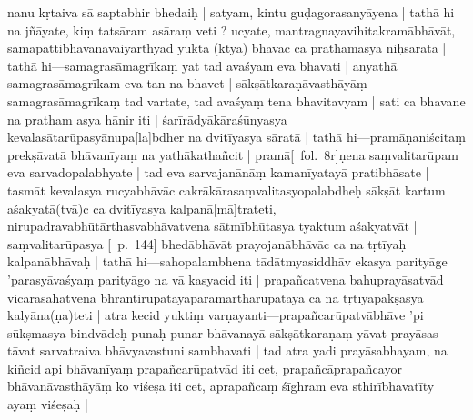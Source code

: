 \documentclass[12pt]{article}
\newcommand{\emdash} {\hspace{0em}—\hspace{0em}}
\begin{document}
nanu kṛtaiva sā saptabhir bhedaiḥ | satyam, kintu guḍagorasanyāyena | tathā hi na jñāyate, kiṃ tatsāram asāraṃ veti ? ucyate, mantragnayavihitakramābhāvāt, samāpattibhāvanāvaiyarthyād yuktā (ktya) bhāvāc ca prathamasya niḥsāratā | tathā hi\emdash samagrasāmagrīkaṃ yat tad avaśyam eva bhavati | anyathā samagrasāmagrīkam eva tan na bhavet | sākṣātkaraṇāvasthāyāṃ samagrasāmagrīkaṃ tad vartate, tad avaśyaṃ tena bhavitavyam | sati ca bhavane na pratham asya hānir iti | śarīrādyākāraśūnyasya kevalasātarūpasyānupa[la]bdher na dvitīyasya sāratā | tathā hi\emdash pramāṇaniścitaṃ prekṣāvatā bhāvanīyaṃ na yathākathañcit | pramā[\MS\ fol.\ 8r]ṇena saṃvalitarūpam eva sarvadopalabhyate | tad eva sarvajanānāṃ kamanīyatayā pratibhāsate | tasmāt kevalasya rucyabhāvāc cakrākārasaṃvalitasyopalabdheḥ sākṣāt kartum aśakyatā(tvā)c ca dvitīyasya kalpanā[mā]trateti, nirupadravabhūtārthasvabhāvatvena sātmībhūtasya tyaktum aśakyatvāt | saṃvalitarūpasya [\EDD\ p.\ 144] bhedābhāvāt prayojanābhāvāc ca na tṛtīyaḥ kalpanābhāvaḥ | tathā hi\emdash sahopalambhena tādātmyasiddhāv ekasya parityāge 'parasyāvaśyaṃ parityāgo na vā kasyacid iti | prapañcatvena bahuprayāsatvād vicārāsahatvena bhrāntirūpatayāparamārtharūpatayā ca na tṛtīyapakṣasya kalyāna(ṇa)teti |  atra kecid yuktiṃ varṇayanti\emdash prapañcarūpatvābhāve 'pi sūkṣmasya bindvādeḥ punaḥ punar bhāvanayā sākṣātkaraṇaṃ yāvat prayāsas tāvat sarvatraiva bhāvyavastuni sambhavati | tad atra yadi prayāsabhayam, na kiñcid api bhāvanīyaṃ prapañcarūpatvād iti cet, prapañcāprapañcayor bhāvanāvasthāyāṃ ko viśeṣa iti cet, aprapañcaṃ śīghram eva sthirībhavatīty ayaṃ viśeṣaḥ |\\
\end{document}
